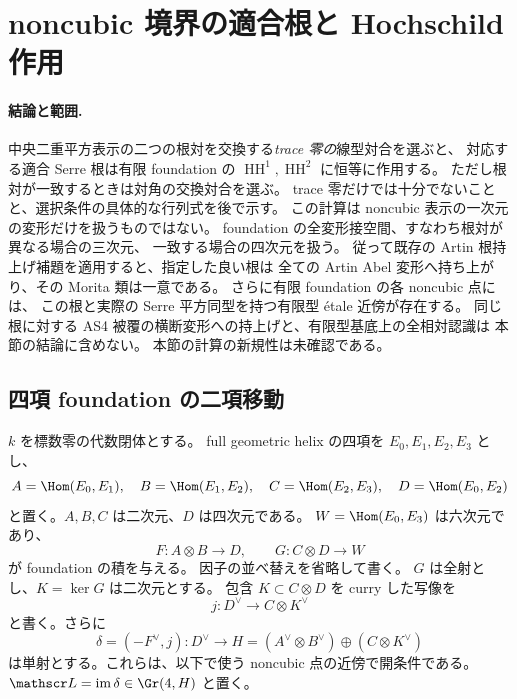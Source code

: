 \section{noncubic 境界の適合根と Hochschild 作用}
\label{sec:noncubic-hh-roots}


\paragraph{結論と範囲.}
中央二重平方表示の二つの根対を交換する\emph{trace 零の}線型対合を選ぶと、
対応する適合 Serre 根は有限 foundation の $\operatorname{HH}^1,\operatorname{HH}^2$ に恒等に作用する。
ただし根対が一致するときは対角の交換対合を選ぶ。
trace 零だけでは十分でないことと、選択条件の具体的な行列式を後で示す。
この計算は noncubic 表示の一次元の変形だけを扱うものではない。
foundation の全変形接空間、すなわち根対が異なる場合の三次元、
一致する場合の四次元を扱う。
従って既存の Artin 根持上げ補題を適用すると、指定した良い根は
全ての Artin Abel 変形へ持ち上がり、その Morita 類は一意である。
さらに有限 foundation の各 noncubic 点には、
この根と実際の Serre 平方同型を持つ有限型 étale 近傍が存在する。
同じ根に対する AS4 被覆の横断変形への持上げと、有限型基底上の全相対認識は
本節の結論に含めない。
本節の計算の新規性は未確認である。

\subsection{四項 foundation の二項移動}

$k$ を標数零の代数閉体とする。
full geometric helix の四項を $E_0,E_1,E_2,E_3$ とし、
\[
A=\Hom(E_0,E_1),\quad B=\Hom(E_1,E_2),\quad
C=\Hom(E_2,E_3),\quad D=\Hom(E_0,E_2)
\]
と置く。$A,B,C$ は二次元、$D$ は四次元である。
$W=\Hom(E_0,E_3)$ は六次元であり、
\[
F:A\otimes B\longrightarrow D,\qquad
G:C\otimes D\longrightarrow W
\]
が foundation の積を与える。
因子の並べ替えを省略して書く。
$G$ は全射とし、$K=\ker G$ は二次元とする。
包含 $K\subset C\otimes D$ を curry した写像を
\[
j:D^{\vee}\longrightarrow C\otimes K^{\vee}
\]
と書く。さらに
\begin{equation}\label{eq:nchh-delta}
\delta=(-F^{\vee},j):D^{\vee}\longrightarrow
H=(A^{\vee}\otimes B^{\vee})\oplus(C\otimes K^{\vee})
\end{equation}
は単射とする。これらは、以下で使う noncubic 点の近傍で開条件である。
$\mathscr L=\operatorname{im}\delta\in\Gr(4,H)$ と置く。

